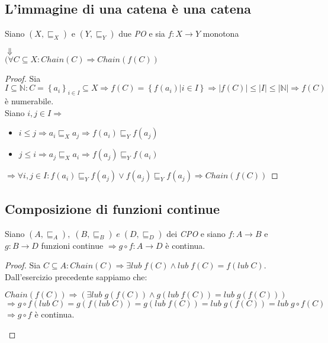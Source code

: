 \documentclass[a4paper, 10pt]{article} %
\begin{document}
\
\subsection{L'immagine di una catena è una catena}
\begin{esercizio}
  Siano $(X, \sqsubseteq_X)$ e $(Y, \sqsubseteq_Y)$ due \emph{PO} e sia $f: X \rightarrow Y$ monotona
  \begin{center}
    $\Downarrow$\\
    $(\forall C \subseteq X : Chain(C) \Rightarrow Chain(f(C))$
  \end{center}
  \begin{proof}
    Sia $I \subseteq \mathbb{N} : C = \left\{a_i\right\}_{i \in I} \subseteq X \Rightarrow f(C) = \left\{f(a_i) | i \in I\right\} \Rightarrow |f(C)| \leq |I| \leq |\mathbb{N}| \Rightarrow f(C)$ è numerabile.\\
    Siano $i,j \in I \Rightarrow $
    \begin{itemize}
      \setlength{\itemindent}{20mm}
    \item $i \leq j \Rightarrow a_i \sqsubseteq_X a_j \Rightarrow f(a_i) \sqsubseteq_Y f(a_j)$
    \item $j \leq i \Rightarrow a_j \sqsubseteq_X a_i \Rightarrow f(a_j) \sqsubseteq_Y f(a_i)$
    \end{itemize}
    $\Rightarrow \forall i,j \in I : f(a_i) \sqsubseteq_Y f(a_j) \lor f(a_j) \sqsubseteq_Y f(a_j) \Rightarrow Chain(f(C))$
  \end{proof}
\end{esercizio}

\newpage
\subsection{Composizione di funzioni continue}
\begin{esercizio}
  Siano $ (A, \sqsubseteq_A), \; (B, \sqsubseteq_B) \; e \; (D, \sqsubseteq_D) $ dei \emph{CPO} e siano $ f: A \rightarrow B $ e $ g: B \rightarrow D $ funzioni continue $ \Rightarrow g \circ f : A \rightarrow D $ è continua.
  \begin{proof}
    Sia $C \subseteq A : Chain(C) \Rightarrow \exists lub \; f(C) \land lub \; f(C) = f(lub \; C)$.
    Dall'esercizio precedente sappiamo che: 
    \begin{center}
      $ Chain(f(C)) \Rightarrow (\exists lub \; g(f(C)) \land g(lub \; f(C)) = lub \; g(f(C))) $\\
      $ \Rightarrow g \circ f(lub \; C) = g(f(lub \; C)) = g(lub \; f(C)) = lub \; g(f(C)) = lub \; g \circ f(C) $\\
      $ \Rightarrow g \circ f$ è continua.
    \end{center}
  \end{proof}
\end{esercizio}
\newpage
\end{document}
